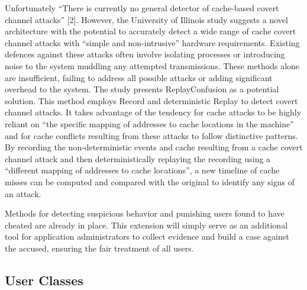\documentclass[12pt]{article}
\begin{document}
Unfortunately “There is currently no general detector of cache-based covert channel attacks” [2]. However,
the University of Illinois study suggests a novel architecture with the potential to accurately detect a wide
range of cache covert channel attacks with “simple and non-intrusive” hardware requirements. Existing defences
against these attacks often involve isolating processes or introducing noise to the system muddling any
attempted transmissions. These methods alone are insufficient, failing to address all possible attacks or
adding significant overhead to the system. The study presents ReplayConfusion as a potential solution.
This method employs Record and deterministic Replay to detect covert channel attacks. It takes advantage
of the tendency for cache attacks to be highly reliant on “the specific mapping of addresses to cache
locations in the machine” and for cache conflicts resulting from these attacks to follow distinctive
patterns. By recording the non-deterministic events and cache resulting from a cache covert channel attack
and then deterministically replaying the recording using a “different mapping of addresses to cache locations”,
a new timeline of cache misses can be computed and compared with the original to identify any signs of an attack.

Methods for detecting suspicious behavior and punishing users found to have cheated are already in place.
This extension will simply serve as an additional tool for application administrators to collect evidence
and build a case against the accused, ensuring the fair treatment of all users.

\subsection{User Classes}
\end{document}
